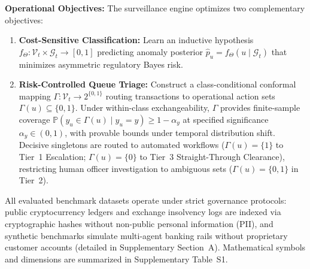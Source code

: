 \textbf{Operational Objectives:} The surveillance engine optimizes two complementary objectives:
\begin{enumerate}[leftmargin=*]
    \item \textbf{Cost-Sensitive Classification:} Learn an inductive hypothesis $f_\Theta: \mathcal{V}_t \times \mathcal{G}_t \to [0, 1]$ predicting anomaly posterior $\hat{p}_u = f_\Theta(u \mid \mathcal{G}_t)$ that minimizes asymmetric regulatory Bayes risk.
    \item \textbf{Risk-Controlled Queue Triage:} Construct a class-conditional conformal mapping $\Gamma: \mathcal{V}_t \to 2^{\{0, 1\}}$ routing transactions to operational action sets $\Gamma(u) \subseteq \{0, 1\}$. Under within-class exchangeability, $\Gamma$ provides finite-sample coverage $\mathbb{P}(y_u \in \Gamma(u) \mid y_u = y) \ge 1 - \alpha_y$ at specified significance $\alpha_y \in (0, 1)$, with provable bounds under temporal distribution shift. Decisive singletons are routed to automated workflows ($\Gamma(u) = \{1\}$ to Tier~1 Escalation; $\Gamma(u) = \{0\}$ to Tier~3 Straight-Through Clearance), restricting human officer investigation to ambiguous sets ($\Gamma(u) = \{0, 1\}$ in Tier~2).
\end{enumerate}
All evaluated benchmark datasets operate under strict governance protocols: public cryptocurrency ledgers and exchange insolvency logs are indexed via cryptographic hashes without non-public personal information (PII), and synthetic benchmarks simulate multi-agent banking rails without proprietary customer accounts (detailed in Supplementary Section~A). Mathematical symbols and dimensions are summarized in Supplementary Table~S1.

